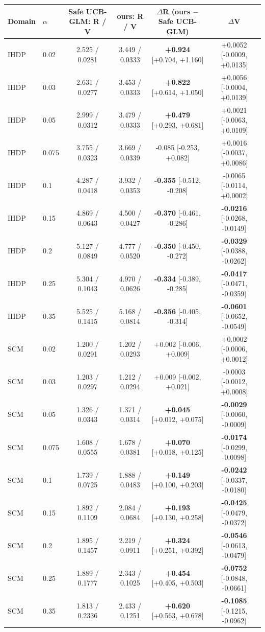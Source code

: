 \begin{tabular}{llcccc}
\toprule
Domain & $\alpha$ & Safe UCB-GLM: R / V & ours: R / V & $\Delta$R (ours $-$ Safe UCB-GLM) & $\Delta$V \\
\midrule
IHDP & 0.02 & 2.525 / 0.0281 & 3.449 / 0.0333 & \textbf{+0.924} [+0.704, +1.160] & +0.0052 [-0.0009, +0.0135] \\
IHDP & 0.03 & 2.631 / 0.0277 & 3.453 / 0.0333 & \textbf{+0.822} [+0.614, +1.050] & +0.0056 [-0.0004, +0.0139] \\
IHDP & 0.05 & 2.999 / 0.0312 & 3.479 / 0.0333 & \textbf{+0.479} [+0.293, +0.681] & +0.0021 [-0.0063, +0.0109] \\
IHDP & 0.075 & 3.755 / 0.0323 & 3.669 / 0.0339 & -0.085 [-0.253, +0.082] & +0.0016 [-0.0037, +0.0086] \\
IHDP & 0.1 & 4.287 / 0.0418 & 3.932 / 0.0353 & \textbf{-0.355} [-0.512, -0.208] & -0.0065 [-0.0114, +0.0002] \\
IHDP & 0.15 & 4.869 / 0.0643 & 4.500 / 0.0427 & \textbf{-0.370} [-0.461, -0.286] & \textbf{-0.0216} [-0.0268, -0.0149] \\
IHDP & 0.2 & 5.127 / 0.0849 & 4.777 / 0.0520 & \textbf{-0.350} [-0.450, -0.272] & \textbf{-0.0329} [-0.0388, -0.0262] \\
IHDP & 0.25 & 5.304 / 0.1043 & 4.970 / 0.0626 & \textbf{-0.334} [-0.389, -0.285] & \textbf{-0.0417} [-0.0471, -0.0359] \\
IHDP & 0.35 & 5.525 / 0.1415 & 5.168 / 0.0814 & \textbf{-0.356} [-0.405, -0.314] & \textbf{-0.0601} [-0.0652, -0.0549] \\
SCM & 0.02 & 1.200 / 0.0291 & 1.202 / 0.0293 & +0.002 [-0.006, +0.009] & +0.0002 [-0.0006, +0.0012] \\
SCM & 0.03 & 1.203 / 0.0297 & 1.212 / 0.0294 & +0.009 [-0.002, +0.021] & -0.0003 [-0.0012, +0.0008] \\
SCM & 0.05 & 1.326 / 0.0343 & 1.371 / 0.0314 & \textbf{+0.045} [+0.012, +0.075] & \textbf{-0.0029} [-0.0060, -0.0009] \\
SCM & 0.075 & 1.608 / 0.0555 & 1.678 / 0.0381 & \textbf{+0.070} [+0.018, +0.125] & \textbf{-0.0174} [-0.0299, -0.0098] \\
SCM & 0.1 & 1.739 / 0.0725 & 1.888 / 0.0483 & \textbf{+0.149} [+0.100, +0.203] & \textbf{-0.0242} [-0.0337, -0.0180] \\
SCM & 0.15 & 1.892 / 0.1109 & 2.084 / 0.0684 & \textbf{+0.193} [+0.130, +0.258] & \textbf{-0.0425} [-0.0479, -0.0372] \\
SCM & 0.2 & 1.895 / 0.1457 & 2.219 / 0.0911 & \textbf{+0.324} [+0.251, +0.392] & \textbf{-0.0546} [-0.0613, -0.0479] \\
SCM & 0.25 & 1.889 / 0.1777 & 2.343 / 0.1025 & \textbf{+0.454} [+0.405, +0.503] & \textbf{-0.0752} [-0.0848, -0.0661] \\
SCM & 0.35 & 1.813 / 0.2336 & 2.433 / 0.1251 & \textbf{+0.620} [+0.563, +0.678] & \textbf{-0.1085} [-0.1215, -0.0962] \\
\bottomrule
\end{tabular}
